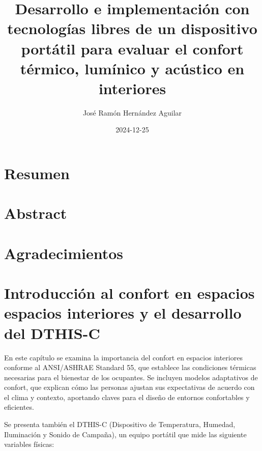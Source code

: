 \documentclass[
  letterpaper,
]{scrbook}
\title{Desarrollo e implementación con tecnologías libres de un
dispositivo portátil para evaluar el confort térmico, lumínico y
acústico en interiores}
\author{José Ramón Hernández Aguilar}
\date{2024-12-25}
\renewcommand*\contentsname{Tabla de contenidos}
\newcommand\contentsname{Tabla de contenidos}
\begin{document}
\frontmatter
\maketitle

\renewcommand*\contentsname{Tabla de contenidos}
{
\setcounter{tocdepth}{2}
\tableofcontents
}

\mainmatter
{}

\chapter*{Resumen}\label{resumen}



\chapter*{Abstract}\label{abstract}



\chapter*{Agradecimientos}\label{agradecimientos}



\chapter{Introducción al confort en espacios espacios interiores y el
desarrollo del
DTHIS-C}\label{introducciuxf3n-al-confort-en-espacios-espacios-interiores-y-el-desarrollo-del-dthis-c}

En este capítulo se examina la importancia del confort en espacios
interiores conforme al ANSI/ASHRAE Standard 55, que establece las
condiciones térmicas necesarias para el bienestar de los ocupantes. Se
incluyen modelos adaptativos de confort, que explican cómo las personas
ajustan sus expectativas de acuerdo con el clima y contexto, aportando
claves para el diseño de entornos confortables y eficientes.

Se presenta también el DTHIS-C (Dispositivo de Temperatura, Humedad,
Iluminación y Sonido de Campaña), un equipo portátil que mide las
siguiente variables físicas:
\end{document}
